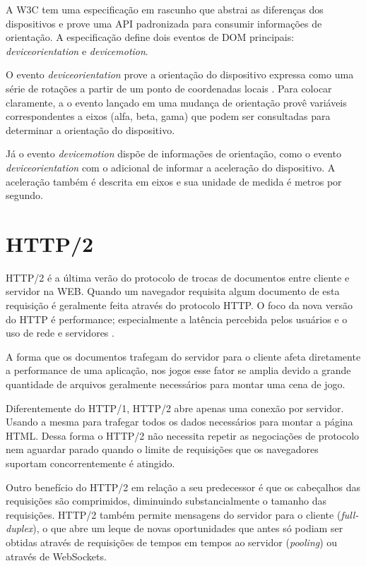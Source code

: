 A W3C tem uma especificação em rascunho que abstrai as diferenças dos
dispositivos e prove uma API padronizada para consumir informações
de orientação. A especificação define dois eventos de DOM
principais: \textit{deviceorientation} e \textit{devicemotion}. 

O evento \textit{deviceorientation} prove a orientação do
dispositivo expressa como uma série de rotações a partir de um
ponto de coordenadas locais \autocite{orientationSpec}. Para colocar
claramente, a o evento lançado em uma mudança de orientação provê
variáveis correspondentes a eixos (alfa, beta, gama) que podem ser
consultadas para determinar a orientação do dispositivo.

Já o evento \textit{devicemotion} dispõe de informações de
orientação, como o evento \textit{deviceorientation} com o adicional
de informar a aceleração do dispositivo. A aceleração também é descrita
em eixos e sua unidade de medida é metros por segundo.

\section{HTTP/2}
HTTP/2 é a última verão do protocolo de trocas de documentos entre
cliente e servidor na WEB. Quando um navegador requisita algum documento
de esta requisição é geralmente feita através do
protocolo HTTP.
O foco da nova versão do HTTP é performance; especialmente a
latência percebida pelos usuários e o uso de rede e servidores \autocite{http2}.

A forma que os documentos trafegam do servidor para o
cliente afeta diretamente a performance de uma aplicação, nos jogos
esse fator se amplia devido a grande quantidade de arquivos geralmente
necessários para montar uma cena de jogo.

Diferentemente do HTTP/1, HTTP/2 abre apenas uma conexão por
servidor. Usando a mesma para trafegar todos os dados necessários para
montar a página HTML. Dessa forma o HTTP/2 não necessita repetir
as negociações de protocolo nem aguardar parado quando o limite de
requisições que os navegadores suportam concorrentemente é atingido.

Outro benefício do HTTP/2 em relação a seu predecessor é que
os cabeçalhos das requisições são comprimidos, diminuindo
substancialmente o tamanho das requisições. HTTP/2 também permite
mensagens do servidor para o cliente (\textit{full-duplex}), o
que abre um leque de novas oportunidades que antes só podiam ser
obtidas através de requisições de tempos em tempos ao servidor
(\textit{pooling}) ou através de WebSockets.

